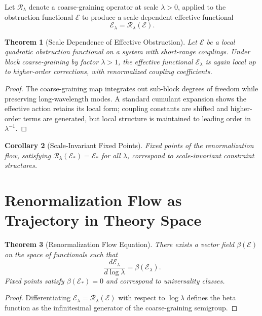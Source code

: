 \documentclass[12pt,a4paper,openany]{book}
\theoremstyle{plain}
\newtheorem{theorem}{Theorem}[chapter]
\newtheorem{corollary}[theorem]{Corollary}
\theoremstyle{definition}
\theoremstyle{remark}
\begin{document}
Let $\mathcal{R}_\lambda$ denote a coarse-graining operator at scale $\lambda > 0$, applied to the obstruction functional $\mathcal{E}$ to produce a scale-dependent effective functional
\[
\mathcal{E}_\lambda = \mathcal{R}_\lambda(\mathcal{E}).
\]

\begin{theorem}[Scale Dependence of Effective Obstruction]
Let $\mathcal{E}$ be a local quadratic obstruction functional on a system with short-range couplings. Under block coarse-graining by factor $\lambda > 1$, the effective functional $\mathcal{E}_\lambda$ is again local up to higher-order corrections, with renormalized coupling coefficients.
\end{theorem}

\begin{proof}
The coarse-graining map integrates out sub-block degrees of freedom while preserving long-wavelength modes. A standard cumulant expansion shows the effective action retains its local form; coupling constants are shifted and higher-order terms are generated, but local structure is maintained to leading order in $\lambda^{-1}$.
\end{proof}

\begin{corollary}[Scale-Invariant Fixed Points]
Fixed points of the renormalization flow, satisfying $\mathcal{R}_\lambda(\mathcal{E}_*) = \mathcal{E}_*$ for all $\lambda$, correspond to scale-invariant constraint structures.
\end{corollary}

\section{Renormalization Flow as Trajectory in Theory Space}

\begin{theorem}[Renormalization Flow Equation]
There exists a vector field $\beta(\mathcal{E})$ on the space of functionals such that
\[
\frac{d\mathcal{E}_\lambda}{d\log\lambda} = \beta(\mathcal{E}_\lambda).
\]
Fixed points satisfy $\beta(\mathcal{E}_*) = 0$ and correspond to universality classes.
\end{theorem}

\begin{proof}
Differentiating $\mathcal{E}_\lambda = \mathcal{R}_\lambda(\mathcal{E})$ with respect to $\log\lambda$ defines the beta function as the infinitesimal generator of the coarse-graining semigroup.
\end{proof}
\end{document}
